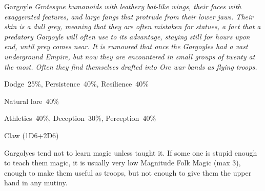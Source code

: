 \begin{monsterbox}{Gargoyle}
	\textit{Grotesque humanoids with leathery bat-like wings, their faces with exaggerated features, and large fangs that protrude from their lower jaws. Their skin is a dull grey, meaning that they are often mistaken for statues, a fact that a predatory Gargoyle will often use to its advantage, staying still for hours upon end, until prey comes near. It is rumoured that once the Gargoyles had a vast underground Empire, but now they are encountered in small groups of twenty at the most. Often they find themselves drafted into Orc war bands as flying troops.}\\
	\rpghline
	\basics[%
        hitpoints  = 14,
	majorwound = 7,
	damagemodifier = +2D6,
	powerpoints = 11,
	movementrate = {15m, 23m flying},
	armor = Tough Hide (6AP),
	plunderrating = 0
	]
	\rpghline%
	\stats[ %
		STR = 5D6+12 (29),
		CON = 3D6    (11),
		DEX = 3D6    (11),
		SIZ = 5D6    (17),
		INT = 1D6    (4),
		POW = 3D6    (11),
		CHA = 1D6    (4)
	]
	\rpghline%
	\begin{rpg-monsteraction}[Resistances]
		Dodge~25\%, Persistence~40\%, Resilience~40\%
	\end{rpg-monsteraction}
	\begin{rpg-monsteraction}[Knowledge]
    		Natural lore~40\%
	\end{rpg-monsteraction}
	\begin{rpg-monsteraction}[Practical]
		Athletics~40\%, Deception~30\%, Perception~40\%
	\end{rpg-monsteraction}
	\begin{rpg-monsteraction}
		Claw (1D6+2D6)
	\end{rpg-monsteraction}
	\begin{rpg-monsteraction}[Supernatural]
		Gargolyes tend not to learn magic unless taught it. If some one is stupid enough to teach them magic, it is usually very low Magnitude Folk Magic (max 3), enough to make them useful as troops, but not enough to give them the upper hand in any mutiny.
	\end{rpg-monsteraction}

\end{monsterbox}




